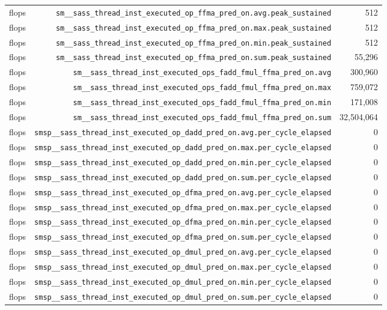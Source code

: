\begin{table}[h]
\begin{tabular}{|l|r|r|}
flops & \texttt{sm__sass_thread_inst_executed_op_ffma_pred_on.avg.peak_sustained} & 512 \\
flops & \texttt{sm__sass_thread_inst_executed_op_ffma_pred_on.max.peak_sustained} & 512 \\
flops & \texttt{sm__sass_thread_inst_executed_op_ffma_pred_on.min.peak_sustained} & 512 \\
flops & \texttt{sm__sass_thread_inst_executed_op_ffma_pred_on.sum.peak_sustained} & 55,296 \\
flops & \texttt{sm__sass_thread_inst_executed_ops_fadd_fmul_ffma_pred_on.avg} & 300,960 \\
flops & \texttt{sm__sass_thread_inst_executed_ops_fadd_fmul_ffma_pred_on.max} & 759,072 \\
flops & \texttt{sm__sass_thread_inst_executed_ops_fadd_fmul_ffma_pred_on.min} & 171,008 \\
flops & \texttt{sm__sass_thread_inst_executed_ops_fadd_fmul_ffma_pred_on.sum} & 32,504,064 \\
flops & \texttt{smsp__sass_thread_inst_executed_op_dadd_pred_on.avg.per_cycle_elapsed} & 0 \\
flops & \texttt{smsp__sass_thread_inst_executed_op_dadd_pred_on.max.per_cycle_elapsed} & 0 \\
flops & \texttt{smsp__sass_thread_inst_executed_op_dadd_pred_on.min.per_cycle_elapsed} & 0 \\
flops & \texttt{smsp__sass_thread_inst_executed_op_dadd_pred_on.sum.per_cycle_elapsed} & 0 \\
flops & \texttt{smsp__sass_thread_inst_executed_op_dfma_pred_on.avg.per_cycle_elapsed} & 0 \\
flops & \texttt{smsp__sass_thread_inst_executed_op_dfma_pred_on.max.per_cycle_elapsed} & 0 \\
flops & \texttt{smsp__sass_thread_inst_executed_op_dfma_pred_on.min.per_cycle_elapsed} & 0 \\
flops & \texttt{smsp__sass_thread_inst_executed_op_dfma_pred_on.sum.per_cycle_elapsed} & 0 \\
flops & \texttt{smsp__sass_thread_inst_executed_op_dmul_pred_on.avg.per_cycle_elapsed} & 0 \\
flops & \texttt{smsp__sass_thread_inst_executed_op_dmul_pred_on.max.per_cycle_elapsed} & 0 \\
flops & \texttt{smsp__sass_thread_inst_executed_op_dmul_pred_on.min.per_cycle_elapsed} & 0 \\
flops & \texttt{smsp__sass_thread_inst_executed_op_dmul_pred_on.sum.per_cycle_elapsed} & 0 \\

\end{tabular}
\end{table}
